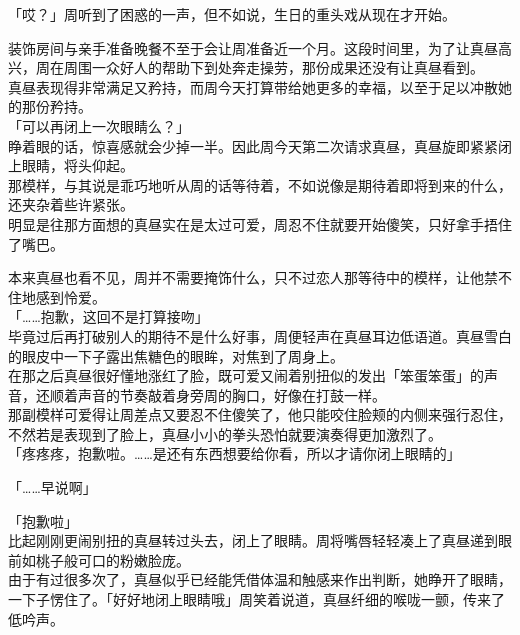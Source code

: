 「哎？」周听到了困惑的一声，但不如说，生日的重头戏从现在才开始。

装饰房间与亲手准备晚餐不至于会让周准备近一个月。这段时间里，为了让真昼高兴，周在周围一众好人的帮助下到处奔走操劳，那份成果还没有让真昼看到。\\

真昼表现得非常满足又矜持，而周今天打算带给她更多的幸福，以至于足以冲散她的那份矜持。\\

「可以再闭上一次眼睛么？」\\

睁着眼的话，惊喜感就会少掉一半。因此周今天第二次请求真昼，真昼旋即紧紧闭上眼睛，将头仰起。\\

那模样，与其说是乖巧地听从周的话等待着，不如说像是期待着即将到来的什么，还夹杂着些许紧张。\\

明显是往那方面想的真昼实在是太过可爱，周忍不住就要开始傻笑，只好拿手捂住了嘴巴。

本来真昼也看不见，周并不需要掩饰什么，只不过恋人那等待中的模样，让他禁不住地感到怜爱。\\

「……抱歉，这回不是打算接吻」\\

毕竟过后再打破别人的期待不是什么好事，周便轻声在真昼耳边低语道。真昼雪白的眼皮中一下子露出焦糖色的眼眸，对焦到了周身上。\\

在那之后真昼很好懂地涨红了脸，既可爱又闹着别扭似的发出「笨蛋笨蛋」的声音，还顺着声音的节奏敲着身旁周的胸口，好像在打鼓一样。\\

那副模样可爱得让周差点又要忍不住傻笑了，他只能咬住脸颊的内侧来强行忍住，不然若是表现到了脸上，真昼小小的拳头恐怕就要演奏得更加激烈了。\\

「疼疼疼，抱歉啦。……是还有东西想要给你看，所以才请你闭上眼睛的」

「……早说啊」

「抱歉啦」\\

比起刚刚更闹别扭的真昼转过头去，闭上了眼睛。周将嘴唇轻轻凑上了真昼递到眼前如桃子般可口的粉嫩脸庞。\\

由于有过很多次了，真昼似乎已经能凭借体温和触感来作出判断，她睁开了眼睛，一下子愣住了。「好好地闭上眼睛哦」周笑着说道，真昼纤细的喉咙一颤，传来了低吟声。\\

